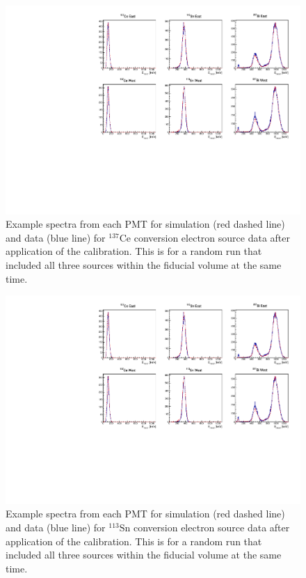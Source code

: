 \begin{figure}
  \centering
  \includegraphics[scale=1,page=2]{4-UCNACalibrations/run_17523.pdf}
  \caption{Example spectra from each PMT for simulation (red dashed line) and data (blue line) for $^{137}\mathrm{Ce}$ conversion electron source
    data after application of the calibration. This is for a random run that included all three sources within the fiducial
    volume at the same time.}
  \label{fig:Ce_spectra}
\end{figure}

\begin{figure}
  \centering
  \includegraphics[scale=1,page=3]{4-UCNACalibrations/run_17523.pdf}
  \caption{Example spectra from each PMT for simulation (red dashed line) and data (blue line) for $^{113}\mathrm{Sn}$ conversion electron source
    data after application of the calibration. This is for a random run that included all three sources within the fiducial
    volume at the same time.}
  \label{fig:Sn_spectra}
\end{figure}

